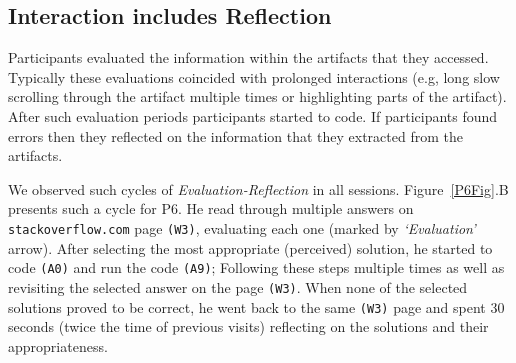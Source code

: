 



\subsection{Interaction includes Reflection}


Participants evaluated the information within the artifacts that they accessed. Typically these evaluations coincided with prolonged interactions (e.g, long slow scrolling through the artifact multiple times or highlighting parts of the artifact). After such evaluation periods participants started to code. If participants found errors then they reflected on the information that they extracted from the artifacts.

We observed such cycles of \textit{Evaluation-Reflection} in all sessions. Figure~\ref{P6Fig}.B presents such a cycle for P6. He read through multiple answers on \texttt{stackoverflow.com} page \texttt{(W3)}, evaluating each one (marked by \textit{`Evaluation'} arrow). After selecting the most appropriate (perceived) solution, he started to code \texttt{(A0)} and run the code \texttt{(A9)}; Following these steps multiple times as well as revisiting the selected answer on the page \texttt{(W3)}. When none of the selected solutions proved to be correct, he went back to the same \texttt{(W3)} page and spent 30 seconds (twice the time of previous visits) reflecting on the solutions and their appropriateness.

